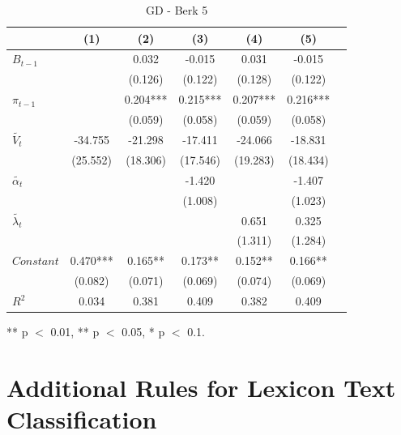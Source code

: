 \documentclass[review]{elsarticle}
\begin{document}
\begin{table}[!ht]
\centering 
  \caption{GD - Berk 5} 
  \label{tab:GD - Berk 5}
\begin{tabular}{l*{6}{c}}   
\toprule
                    & (1) & (2) & (3) & (4) & (5) \\
\midrule
$B_{t-1}$           &     & 0.032 & -0.015 & 0.031 & -0.015 \\
                    &     & (0.126) & (0.122) & (0.128) & (0.122) \\
$\pi_{t-1}$         &     & 0.204*** & 0.215*** & 0.207*** & 0.216*** \\
                    &     & (0.059) & (0.058) & (0.059) & (0.058) \\
$\tilde{V_t}$       & -34.755 & -21.298 & -17.411 & -24.066 & -18.831 \\
                    & (25.552) & (18.306) & (17.546) & (19.283) & (18.434) \\
$\tilde{\alpha_t}$  &     &     & -1.420 &     & -1.407 \\
                    &     &     & (1.008) &     & (1.023) \\
$\tilde{\lambda_t}$ &     &     &     & 0.651 & 0.325 \\
                    &     &     &     & (1.311) & (1.284) \\
$Constant$          & 0.470*** & 0.165** & 0.173** & 0.152** & 0.166** \\
                    & (0.082) & (0.071) & (0.069) & (0.074) & (0.069) \\
\midrule
$R^2$               & 0.034 & 0.381 & 0.409 & 0.382 & 0.409 \\
\bottomrule
\end{tabular} 
\parbox{0.8\textwidth}{\centering \small *** p $<$ 0.01, ** p $<$ 0.05, * p $<$ 0.1.}
\end{table}


\section{Additional Rules for Lexicon Text Classification}\label{sec:Additional Rules for Lexicon Text Classification}
\newpage
\end{document}
